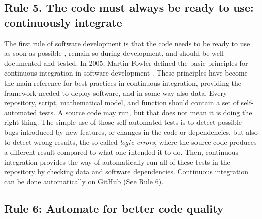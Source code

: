 \documentclass[10pt,letterpaper]{article}
\begin{document}
\subsection*{Rule 5. The code must always be ready to use: continuously
integrate}\label{rule-5.-the-code-must-always-be-ready-to-use-continuously-integrate}

The first rule of software development is that the code needs to be
ready to use as soon as possible \cite{Leprevost:2014}, remain so during
development, and should be well-documented and tested. In 2005, Martin
Fowler defined the basic principles for continuous integration in
software development \cite{FowlerCI}. These principles have become the
main reference for best practices in continuous integration, providing
the framework needed to deploy software, and in some way also data.
Every repository, script, mathematical model, and function should
contain a set of self-automated tests. A source code may run, but that
does not mean it is doing the right thing. The simple use of those
self-automated tests is to detect possible bugs introduced by new
features, or changes in the code or dependencies, but also to detect
wrong results, the so called \emph{logic errors}, where the source code
produces a different result compared to what one intended it to do.
Then, continuous integration provides the way of automatically run all
of these tests in the repository by checking data and software
dependencies. Continuous integration can be done automatically on GitHub
(See Rule 6).

\subsection*{Rule 6: Automate for better code
quality}\label{rule-6-automate-for-better-code-quality}
\end{document}
